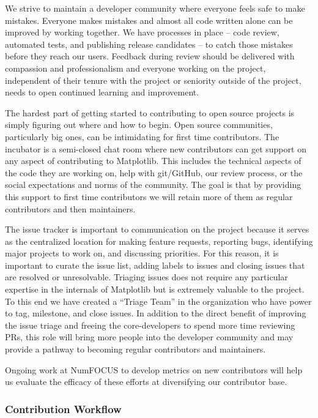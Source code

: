 \documentclass[12pt]{article}
\numberwithin{page}{section}
\begin{document}
We strive to maintain a developer community where everyone feels safe to make
mistakes. Everyone makes mistakes and almost all code written alone can be
improved by working together.  We have processes in place -- code review,
automated tests, and publishing release candidates -- to catch those mistakes
before they reach our users.  Feedback during review should be delivered with
compassion and professionalism and everyone working on the project, independent
of their tenure with the project or seniority outside of the project, needs to
open continued learning and improvement.



The hardest part of getting started to contributing to open source
projects is simply figuring out where and how to begin.  Open source communities,
particularly big ones, can be intimidating for first time
contributors.  The incubator is a semi-closed chat room where new
contributors can get support on any aspect of contributing to
Matplotlib.  This includes the technical aspects of the code they are
working on, help with git/GitHub, our review process, or the social
expectations and norms of the community.  The goal is that by
providing this support to first time contributors we will retain more
of them as regular contributors and then maintainers.

The issue tracker is important to communication on the project because
it serves as the centralized location for making feature requests,
reporting bugs, identifying major projects to work on, and discussing
priorities.  For this reason, it is important to curate the issue
list, adding labels to issues and closing issues that are resolved or
unresolvable. Triaging issues does not require any particular
expertise in the internals of Matplotlib but is extremely valuable to
the project.  To this end we have created a ``Triage Team'' in the
organization who have power to tag, milestone, and close issues.  In
addition to the direct benefit of improving the issue triage and
freeing the core-developers to spend more time reviewing PRs, this
role will bring more people into the developer community and may
provide a pathway to becoming regular contributors and maintainers.

Ongoing work at NumFOCUS to develop metrics on new contributors
will help us evaluate the
efficacy of these efforts at diversifying our contributor base.

\subsubsection{Contribution Workflow}
\end{document}
